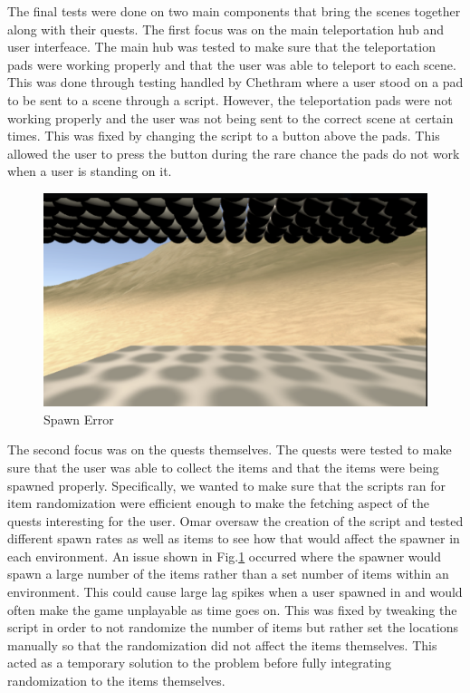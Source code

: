 \documentclass{vgtc}                          %
\begin{document}
The final tests were done on two main components that bring the scenes together along with their quests. The first focus was on the main teleportation hub and user interfeace. The main hub was tested to make sure that the teleportation pads were working properly and that the user was able to teleport to each scene. This was done through testing handled by Chethram where
a user stood on a pad to be sent to a scene through a script. However, the teleportation pads were not working properly and the user was not being sent to the correct scene at certain times. This was fixed by changing the script to a button above the pads. This allowed the user to press the button during the rare chance the pads do not work when a user is standing on it.

\begin{figure}[ht!]
  \centering
  \includegraphics[width= 0.8\linewidth]{Figures/SpawnerBug.png}
  \caption{Spawn Error}
  \label{fig:spawnbug}
\end{figure}

The second focus was on the quests themselves. The quests were tested to make sure that the user was able to collect the items and that the items were being spawned properly. Specifically, we wanted to make sure that the scripts ran for item randomization were efficient enough to make the fetching aspect of the quests interesting for the user. Omar oversaw the creation of the script and tested
different spawn rates as well as items to see how that would affect the spawner in each environment. An issue shown in Fig.\ref{fig:spawnbug} occurred where the spawner would spawn a large number of the items rather than a set number of items within an environment. This could cause large lag spikes when a user spawned in and would often make the game unplayable as time goes on. This was fixed by tweaking
the script in order to not randomize the number of items but rather set the locations manually so that the randomization did not affect the items themselves. This acted as a temporary solution to the problem before fully integrating randomization to the items themselves.
\end{document}
